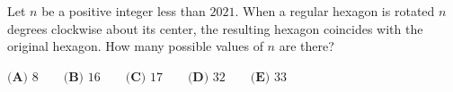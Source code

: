 Let $n$ be a positive integer less than $2021$. When a regular hexagon is rotated $n$ degrees clockwise about its center, the resulting hexagon coincides with the original hexagon. How many possible values of $n$ are there?

$\textbf{(A) }8\qquad \textbf{(B) } 16\qquad\textbf{(C) } 17\qquad\textbf{(D) } 32\qquad\textbf{(E) }33$
